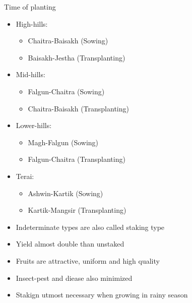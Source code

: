 \documentclass[
  ignorenonframetext,
  aspectratio=169]{beamer}
\providecommand{\tightlist}{%
  \setlength{\itemsep}{0pt}\setlength{\parskip}{0pt}}
\begin{document}
\begin{frame}{Time of planting}
\protect\hypertarget{time-of-planting}{}
\begin{itemize}
\tightlist
\item
  High-hills:

  \begin{itemize}
  \tightlist
  \item
    Chaitra-Baisakh (Sowing)
  \item
    Baisakh-Jestha (Transplanting)
  \end{itemize}
\item
  Mid-hills:

  \begin{itemize}
  \tightlist
  \item
    Falgun-Chaitra (Sowing)
  \item
    Chaitra-Baisakh (Transplanting)
  \end{itemize}
\item
  Lower-hills:

  \begin{itemize}
  \tightlist
  \item
    Magh-Falgun (Sowing)
  \item
    Falgun-Chaitra (Transplanting)
  \end{itemize}
\item
  Terai:

  \begin{itemize}
  \tightlist
  \item
    Ashwin-Kartik (Sowing)
  \item
    Kartik-Mangsir (Transplanting)
  \end{itemize}
\end{itemize}
\end{frame}

\begin{frame}{}
\protect\hypertarget{section-4}{}
\begin{itemize}
\tightlist
\item
  Indeterminate types are also called staking type
\item
  Yield almost double than unstaked
\item
  Fruits are attractive, uniform and high quality
\item
  Insect-pest and diease also minimized
\item
  Stakign utmost necessary when growing in rainy season
\end{itemize}
\end{frame}
\end{document}
